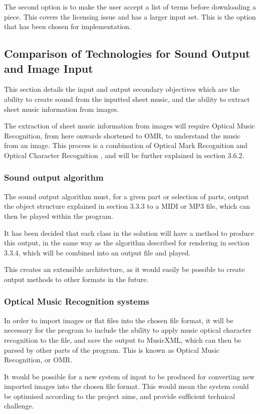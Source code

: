 The second option is to make the user accept a list of terms before downloading a piece. This covers the licensing issue and has a larger input set. This is the option that has been chosen for implementation.

\subsection{Comparison of Technologies for Sound Output and Image Input}
This section details the input and output secondary objectives which are the ability to create sound from the inputted sheet music, and the ability to extract sheet music information from images.

The extraction of sheet music information from images will require Optical Music Recognition, from here onwards shortened to OMR, to understand the music from an image. This process is a combination of Optical Mark Recognition and Optical Character Recognition \parencite{pakitan},
 and will be further explained in section 3.6.2.
\subsubsection{Sound output algorithm}
The sound output algorithm must, for a given part or selection of parts, output the object structure explained in section 3.3.3 to a MIDI or MP3 file, which can then be played within the program. 

It has been decided that each class in the solution will have a method to produce this output, in the same way as the algorithm described for rendering in section 3.3.4, which will be combined into an output file and played.

This creates an extensible architecture, as it would easily be possible to create output methods to other formats in the future.

\subsubsection{Optical Music Recognition systems}
In order to import images or flat files into the chosen file format, it will be necessary for the program to include the ability to apply music optical character recognition to the file, and save the output to MusicXML, which can then be parsed by other parts of the program. This is known as Optical Music Recognition, or OMR.

It would be possible for a new system of input to be produced for converting new imported images into the chosen file format. This would mean the system  could be optimised according to the project aims, and provide sufficient technical challenge.

